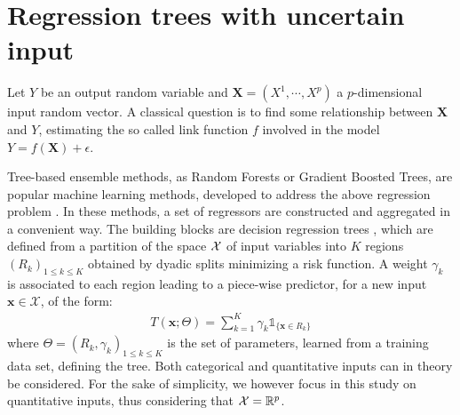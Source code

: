 \section{Regression trees with uncertain input}
\label{sec:model}

Let $Y$ be an output random variable and $\boldsymbol{X} = (X^1,\cdots,X^p)$ a $p$-dimensional input random vector. A classical question is to find some relationship between $\boldsymbol{X}$ and $Y$, estimating the so called link function $f$ involved in the model $Y=f(\boldsymbol{X})+\epsilon$.

Tree-based ensemble methods, as Random Forests or Gradient Boosted Trees, are popular machine learning methods, developed to address the above regression problem \cite{HastieTibshiraniFriedman}. In these methods, a set of regressors are constructed and aggregated in a convenient way. The building blocks are decision regression trees \cite{breiman1984classification}, which are defined from a partition of the space ${\cal X}$ of input variables into $K$ regions $(R_k)_{1\leq k \leq K}$ obtained by dyadic splits minimizing a risk function. A weight $\gamma_k$ is associated to each region leading to a piece-wise predictor, for a new input $\boldsymbol{x} \in \mathcal{X}$, of the form:
%
\begin{align}
T\left(\boldsymbol{x}; \Theta\right) = \sum_{k=1}^K \gamma_k \mathds{1}_{\lbrace \boldsymbol{x} \in R_k \rbrace}
\label{treeClassical}
\end{align}
%
where $\Theta = (R_k, \gamma_k)_{1\leq k \leq K}$ is the set of parameters, learned from a training data set, defining the tree. Both categorical and quantitative inputs can in theory be considered. For the sake of simplicity, we however focus in this study on quantitative inputs, thus considering that ${\cal X} = \mathbb{R}^p$.

